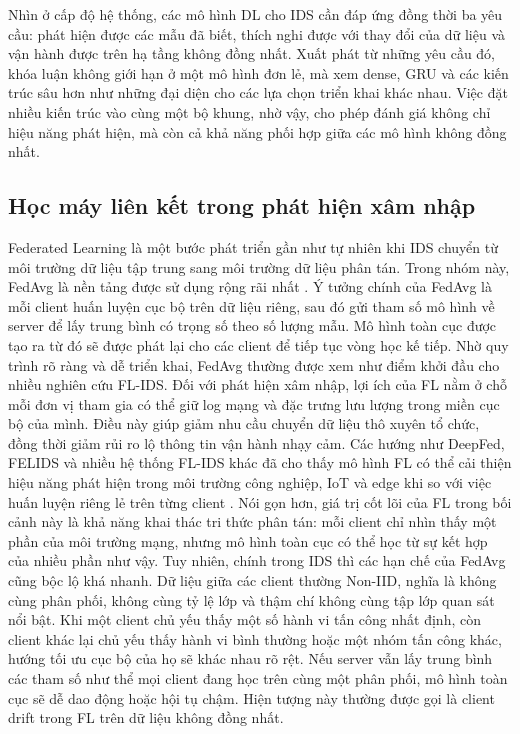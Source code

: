 \bigbreak\noindent
Nhìn ở cấp độ hệ thống, các mô hình DL cho IDS cần đáp ứng đồng thời ba yêu cầu: phát hiện được các mẫu đã biết, thích nghi được với thay đổi của dữ liệu và vận hành được trên hạ tầng không đồng nhất. Xuất phát từ những yêu cầu đó, khóa luận không giới hạn ở một mô hình đơn lẻ, mà xem dense, GRU và các kiến trúc sâu hơn như những đại diện cho các lựa chọn triển khai khác nhau. Việc đặt nhiều kiến trúc vào cùng một bộ khung, nhờ vậy, cho phép đánh giá không chỉ hiệu năng phát hiện, mà còn cả khả năng phối hợp giữa các mô hình không đồng nhất.

\subsection{Học máy liên kết trong phát hiện xâm nhập}

Federated Learning là một bước phát triển gần như tự nhiên khi IDS chuyển từ môi trường dữ liệu tập trung sang môi trường dữ liệu phân tán. Trong nhóm này, FedAvg là nền tảng được sử dụng rộng rãi nhất \cite{fedavg}. Ý tưởng chính của FedAvg là mỗi client huấn luyện cục bộ trên dữ liệu riêng, sau đó gửi tham số mô hình về server để lấy trung bình có trọng số theo số lượng mẫu. Mô hình toàn cục được tạo ra từ đó sẽ được phát lại cho các client để tiếp tục vòng học kế tiếp. Nhờ quy trình rõ ràng và dễ triển khai, FedAvg thường được xem như điểm khởi đầu cho nhiều nghiên cứu FL-IDS.
\bigbreak\noindent
Đối với phát hiện xâm nhập, lợi ích của FL nằm ở chỗ mỗi đơn vị tham gia có thể giữ log mạng và đặc trưng lưu lượng trong miền cục bộ của mình. Điều này giúp giảm nhu cầu chuyển dữ liệu thô xuyên tổ chức, đồng thời giảm rủi ro lộ thông tin vận hành nhạy cảm. Các hướng như DeepFed, FELIDS và nhiều hệ thống FL-IDS khác đã cho thấy mô hình FL có thể cải thiện hiệu năng phát hiện trong môi trường công nghiệp, IoT và edge khi so với việc huấn luyện riêng lẻ trên từng client \cite{li2020deepfed,FRIHA202217felids,bhavsar2024flids,popoola2021flids}. Nói gọn hơn, giá trị cốt lõi của FL trong bối cảnh này là khả năng khai thác tri thức phân tán: mỗi client chỉ nhìn thấy một phần của môi trường mạng, nhưng mô hình toàn cục có thể học từ sự kết hợp của nhiều phần như vậy.
\bigbreak\noindent
Tuy nhiên, chính trong IDS thì các hạn chế của FedAvg cũng bộc lộ khá nhanh. Dữ liệu giữa các client thường Non-IID, nghĩa là không cùng phân phối, không cùng tỷ lệ lớp và thậm chí không cùng tập lớp quan sát nổi bật. Khi một client chủ yếu thấy một số hành vi tấn công nhất định, còn client khác lại chủ yếu thấy hành vi bình thường hoặc một nhóm tấn công khác, hướng tối ưu cục bộ của họ sẽ khác nhau rõ rệt. Nếu server vẫn lấy trung bình các tham số như thể mọi client đang học trên cùng một phân phối, mô hình toàn cục sẽ dễ dao động hoặc hội tụ chậm. Hiện tượng này thường được gọi là client drift trong FL trên dữ liệu không đồng nhất.
